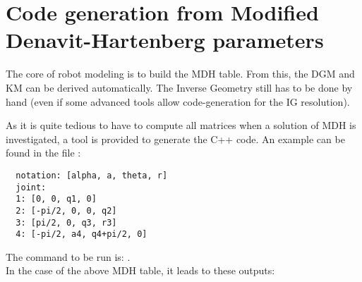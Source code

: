 \documentclass{ecnreport}
\begin{document}
  
  \newpage
  \section{Code generation from Modified Denavit-Hartenberg parameters}\label{dhcode}
  
  The core of robot modeling is to build the MDH table. From this, the DGM and KM can be derived automatically. The Inverse Geometry still has to be done by hand (even if some advanced tools allow code-generation for the IG resolution).
  
  As it is quite tedious to have to compute all matrices when a solution of MDH is investigated, a tool is provided to generate the C++ code. An example can be found in the file :
  \cppstyle
  \begin{lstlisting}
  notation: [alpha, a, theta, r]
  joint:
  1: [0, 0, q1, 0]
  2: [-pi/2, 0, 0, q2]
  3: [pi/2, 0, q3, r3]
  4: [-pi/2, a4, q4+pi/2, 0]
  \end{lstlisting}
  The command to be run is: .\\
  In the case of the above MDH table, it leads to these outputs:
  
\end{document}

